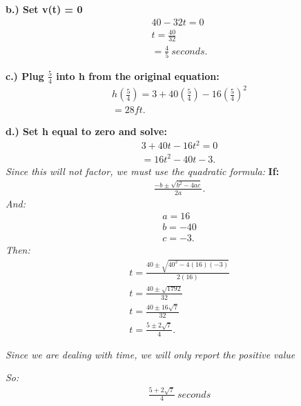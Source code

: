 \documentclass{report}
\begin{document}
   \bigbreak \noindent
   \textbf{b.) Set v(t) =  0}
   \begin{align*}
     40 - 32t = 0 \\
     t = \frac{40}{32} \\
     = \frac{4}{5}\ seconds
   .\end{align*}

   \bigbreak \noindent 

   \bigbreak \noindent 
   \textbf{c.) Plug $\frac{5}{4}$ into h from the original equation:}
   \begin{align*}
     h(\frac{5}{4}) = 3+40(\frac{5}{4}) - 16(\frac{5}{4})^{2} \\
     = 28ft
   .\end{align*}

   \bigbreak \noindent 
   \textbf{d.) Set h equal to zero and solve:}
   \begin{align*}
     3+40t-16t^{2} =  0 \\
     = 16t^{2} -40t -3
   .\end{align*}
    \textit{Since this will not factor, we must use the quadratic formula:}
    \bigbreak \noindent 
    \textbf{If:}
    \begin{align*}
     \frac{-b\pm \sqrt{b^{2}-4ac}}{2a} 
    .\end{align*}
    \bigbreak \noindent 
    \textit{And:}
    \begin{align*}
      a = 16 \\
      b = -40 \\
      c = -3
    .\end{align*}
    \bigbreak \noindent 
    \textit{Then:}
    \begin{align*}
      t = \frac{40\pm \sqrt{40^{2}-4(16)(-3)}}{2(16)} \\
      t = \frac{40 \pm \sqrt{1792}}{32} \\ 
      t = \frac{40 \pm 16\sqrt{7}}{32} \\
      t = \frac{5 \pm 2\sqrt{7}}{4}
    .\end{align*}

    \bigbreak \noindent 
    \textit{Since we are dealing with time, we will only report the positive value}

    \bigbreak \noindent
    \textit{So:}
    \begin{align*}
      \frac{5 + 2 \sqrt{7}}{4}\ seconds
    \end{align*}
\end{document}

